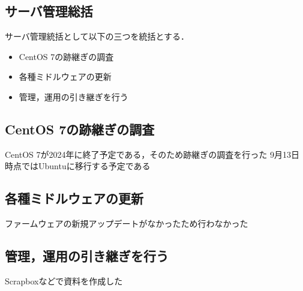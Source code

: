 \subsection*{サーバ管理総括}


サーバ管理統括として以下の三つを統括とする．
\begin{itemize}
    \item CentOS 7の跡継ぎの調査
    \item 各種ミドルウェアの更新
    \item 管理，運用の引き継ぎを行う
\end{itemize}

\subsection*{CentOS 7の跡継ぎの調査}
CentOS 7が2024年に終了予定である，そのため跡継ぎの調査を行った
9月13日時点ではUbuntuに移行する予定である

\subsection*{各種ミドルウェアの更新}
ファームウェアの新規アップデートがなかったため行わなかった

\subsection*{管理，運用の引き継ぎを行う}
Scrapboxなどで資料を作成した
